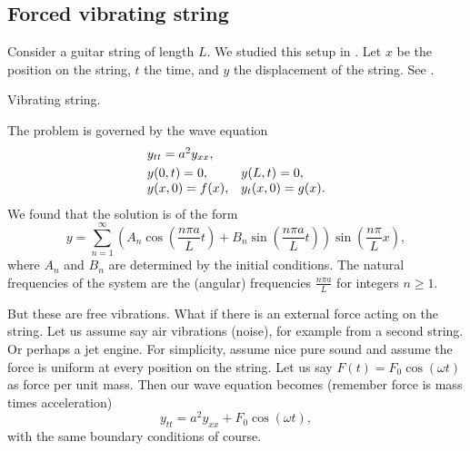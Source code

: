 
\subsection{Forced vibrating string}

Consider a guitar string of length $L$.  We studied this 
setup in .
Let $x$ be the position on the string, $t$ the time, and $y$ the displacement of the string.  See
.

\begin{myfig}
\capstart
{}
\caption{Vibrating string.\label{sps:vibstrfig}}
\end{myfig}

The problem is governed by the wave equation
\begin{equation} \label{sps:freevib}
\begin{array}{ll}
y_{tt} = a^2 y_{xx} , & \\
\noalign{\smallskip}
y(0,t) = 0 , & y(L,t) = 0 , \\
y(x,0) = f(x) , & y_t(x,0) = g(x) .
\end{array}
\end{equation}
We found that the solution is of the form
\begin{equation*}
y = 
\sum_{n=1}^\infty \left( A_n \cos \left( \frac{n\pi a}{L} t \right) +
B_n \sin \left( \frac{n\pi a}{L} t \right) \right)
\sin \left( \frac{n\pi}{L} x \right) ,
\end{equation*}
where $A_n$ and $B_n$ are determined by the initial conditions.  The natural
frequencies of the system are the (angular) frequencies $\frac{n \pi a}{L}$
for integers $n \geq 1$.

But these are free vibrations.  What if there is an external force acting on
the string.  Let us assume say air vibrations (noise), for example from a second
string.  Or perhaps a jet engine.  For simplicity, assume nice pure
sound and assume the force is uniform at every position on the string.
Let us say $F(t) = F_0 \cos (\omega t)$ as force per unit mass.  Then our wave
equation becomes (remember force is mass times acceleration)
\begin{equation} \label{sps:forcedeq}
y_{tt} = a^2 y_{xx} + F_0 \cos ( \omega t) ,
\end{equation}
with the same boundary conditions of course.

